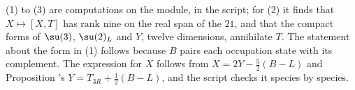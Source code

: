 (1) to (3) are computations on the module, in the script; for (2) it finds that $X \mapsto [X, T]$ has rank nine on the real span of the $21$, and that the compact forms of $\su(3)$, $\su(2)_{L}$ and $Y$, twelve dimensions, annihilate $T$. The statement about the form in (1) follows because $B$ pairs each occupation state with its complement. The expression for $X$ follows from $X = 2Y - \tfrac52(B - L)$ and Proposition 's $Y = T_{3R} + \tfrac12(B - L)$, and the script checks it species by species.
